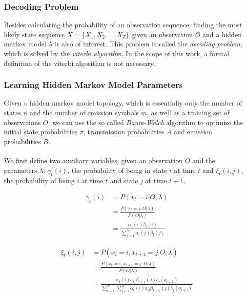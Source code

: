 \subsubsection{Decoding Problem}
Besides calculating the probability of an observation sequence, finding the most likely state sequence $X = \{X_1, X_2, \dots, X_T\}$ given an observation $O$ and a hidden markov model $\lambda$ is also of interest. 
This problem is called the \textit{decoding problem}, which is solved by the \textit{viterbi algorithm}. In the scope of this work, a formal definition of the viterbi algorithm is not necessary. 

\subsubsection{Learning Hidden Markov Model Parameters}
Given a hidden markov model topology, which is essentially only the number of states $n$ and the number of emission symbols $m$, as well as a training set of observations $O$, we can use the so called \textit{Baum-Welch} algorithm to optimize the initial state probabilities $\pi$, transmission probabilities $A$ and emission probabilities $B$. \\ \\
We first define two auxiliary variables, given an observation $O$ and the parameters $\lambda$: $\gamma_t(i)$, the probability of being in state $i$ at time $t$ and $\xi_t(i, j)$, the probability of being $i$ at time $t$ and state $j$ at time $t + 1$.

\begin{minipage}{0.45\textwidth}
\begin{align*}
\gamma_t(i) &= P(x_t = i|O,\lambda) \\
&= \frac{P(x_t = i, O|\lambda)}{P(O|\lambda)} \\
&=\frac{\alpha_t(i)\beta_t(i)}{\sum_{j = 1}^{N} \alpha_t(j) \beta_t(j)} 
\end{align*}
\end{minipage}
\hfill
\begin{minipage}{0.45\textwidth}
\begin{align*}
\xi_t(i, j) &= P(x_t = i,x_{t + 1} = j|O,\lambda) \\
&= \frac{P(x_t = i,x_{t + 1} = j, O|\lambda)}{P(O|\lambda)} \\
&=\frac{\alpha_t(i)a_{ij}\beta_{t + 1}(j)b_j(o_{t + 1})}{\sum_{i = 1}^{N} \sum_{j = 1}^{N} \alpha_t(i)a_{ij}\beta_{t + 1}(j)b_j(o_{t + 1})}
\end{align*}
\end{minipage}


